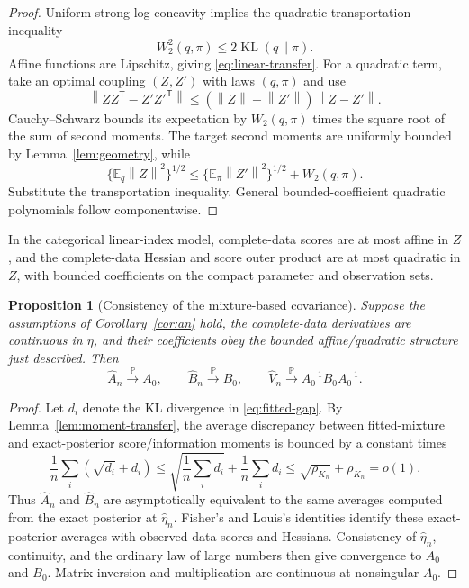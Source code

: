 \documentclass[11pt]{article}
\newtheorem{proposition}[theorem]{Proposition}
\theoremstyle{definition}
\newcommand{\E}{\mathbb E}
\newcommand{\Pp}{\mathbb P}
\newcommand{\KL}{\operatorname{KL}}
\newcommand{\trans}{\mathsf T}
\newcommand{\norm}[1]{\left\lVert #1\right\rVert}
\begin{document}
\begin{proof}
Uniform strong log-concavity implies the quadratic transportation inequality~\cite{ottovillani2000}
\[
W_2^2(q,\pi)\le2\KL(q\|\pi).
\]
Affine functions are Lipschitz, giving \cref{eq:linear-transfer}. For a quadratic term, take an optimal coupling $(Z,Z')$ with laws $(q,\pi)$ and use
\[
\norm{ZZ^{\trans}-Z'Z'^{\trans}}
\le(\norm Z+\norm{Z'})\norm{Z-Z'}.
\]
Cauchy--Schwarz bounds its expectation by $W_2(q,\pi)$ times the square root of the sum of second moments. The target second moments are uniformly bounded by Lemma~\ref{lem:geometry}, while
\[
\{\E_q\norm Z^2\}^{1/2}
\le
\{\E_\pi\norm{Z'}^2\}^{1/2}+W_2(q,\pi).
\]
Substitute the transportation inequality. General bounded-coefficient quadratic polynomials follow componentwise.
\end{proof}

In the categorical linear-index model, complete-data scores are at most affine in $Z$, and the complete-data Hessian and score outer product are at most quadratic in $Z$, with bounded coefficients on the compact parameter and observation sets.

\begin{proposition}[Consistency of the mixture-based covariance]
\label{prop:covariance}
Suppose the assumptions of Corollary~\ref{cor:an} hold, the complete-data derivatives are continuous in $\eta$, and their coefficients obey the bounded affine/quadratic structure just described. Then
\begin{equation}
\widehat A_n\xrightarrow{\Pp}A_0,
\qquad
\widehat B_n\xrightarrow{\Pp}B_0,
\qquad
\widehat V_n\xrightarrow{\Pp}A_0^{-1}B_0A_0^{-1}.
\label{eq:cov-consistency}
\end{equation}
\end{proposition}

\begin{proof}
Let $d_i$ denote the KL divergence in \cref{eq:fitted-gap}. By Lemma~\ref{lem:moment-transfer}, the average discrepancy between fitted-mixture and exact-posterior score/information moments is bounded by a constant times
\[
\frac1n\sum_i(\sqrt{d_i}+d_i)
\le
\sqrt{\frac1n\sum_id_i}
+
\frac1n\sum_id_i
\le
\sqrt{\rho_{K_n}}+\rho_{K_n}
=o(1).
\]
Thus $\widehat A_n$ and $\widehat B_n$ are asymptotically equivalent to the same averages computed from the exact posterior at $\widehat\eta_n$. Fisher's and Louis's identities identify these exact-posterior averages with observed-data scores and Hessians. Consistency of $\widehat\eta_n$, continuity, and the ordinary law of large numbers then give convergence to $A_0$ and $B_0$. Matrix inversion and multiplication are continuous at nonsingular $A_0$.
\end{proof}
\end{document}
